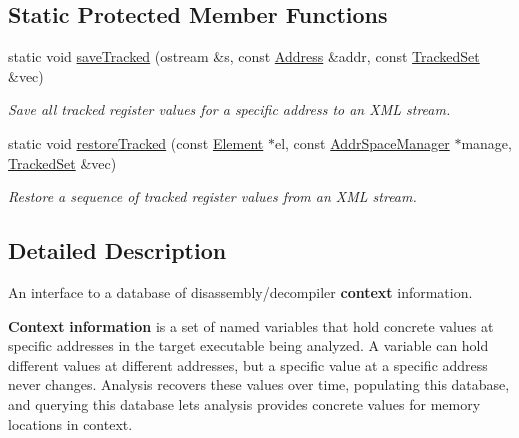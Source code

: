 \subsection*{Static Protected Member Functions}
\begin{DoxyCompactItemize}
\item 
static void \mbox{\hyperlink{class_context_database_ab2fb0798b9a7831b68c5c22117d6d2c7}{save\+Tracked}} (ostream \&s, const \mbox{\hyperlink{class_address}{Address}} \&addr, const \mbox{\hyperlink{globalcontext_8hh_a7559d2c55c5d12fbbaf0418733b62438}{Tracked\+Set}} \&vec)
\begin{DoxyCompactList}\small\item\em Save all tracked register values for a specific address to an X\+ML stream. \end{DoxyCompactList}\item 
static void \mbox{\hyperlink{class_context_database_a566bc8f30012254edd3c86303c479386}{restore\+Tracked}} (const \mbox{\hyperlink{class_element}{Element}} $\ast$el, const \mbox{\hyperlink{class_addr_space_manager}{Addr\+Space\+Manager}} $\ast$manage, \mbox{\hyperlink{globalcontext_8hh_a7559d2c55c5d12fbbaf0418733b62438}{Tracked\+Set}} \&vec)
\begin{DoxyCompactList}\small\item\em Restore a sequence of tracked register values from an X\+ML stream. \end{DoxyCompactList}\end{DoxyCompactItemize}


\subsection{Detailed Description}
An interface to a database of disassembly/decompiler {\bfseries{context}} information. 

{\bfseries{Context}} {\bfseries{information}} is a set of named variables that hold concrete values at specific addresses in the target executable being analyzed. A variable can hold different values at different addresses, but a specific value at a specific address never changes. Analysis recovers these values over time, populating this database, and querying this database lets analysis provides concrete values for memory locations in context.

